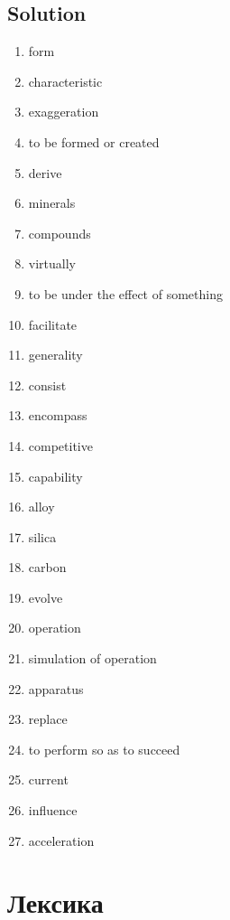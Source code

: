 \subsection*{Solution}
\begin{enumerate}
      \item form
      \item characteristic
      \item exaggeration
      \item to be formed or created
      \item derive
      \item minerals
      \item compounds
      \item virtually
      \item to be under the effect of something
      \item facilitate
      \item generality
      \item consist
      \item encompass
      \item competitive
      \item capability
      \item alloy
      \item silica
      \item carbon
      \item evolve
      \item operation
      \item simulation of operation
      \item apparatus
      \item replace
      \item to perform so as to succeed
      \item current
      \item influence
      \item acceleration
\end{enumerate}

\section{Лексика}


